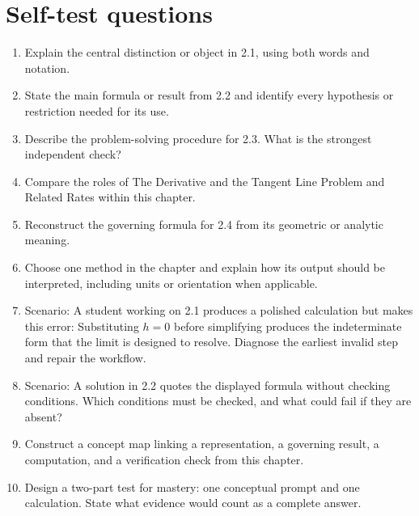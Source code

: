 \documentclass[11pt]{article}
\begin{document}
\section{Self-test questions}
\begin{enumerate}
\item Explain the central distinction or object in 2.1, using both words and notation.
\item State the main formula or result from 2.2 and identify every hypothesis or restriction needed for its use.
\item Describe the problem-solving procedure for 2.3. What is the strongest independent check?
\item Compare the roles of The Derivative and the Tangent Line Problem and Related Rates within this chapter.
\item Reconstruct the governing formula for 2.4 from its geometric or analytic meaning.
\item Choose one method in the chapter and explain how its output should be interpreted, including units or orientation when applicable.
\item Scenario: A student working on 2.1 produces a polished calculation but makes this error: Substituting $h=0$ before simplifying produces the indeterminate form that the limit is designed to resolve. Diagnose the earliest invalid step and repair the workflow.
\item Scenario: A solution in 2.2 quotes the displayed formula without checking conditions. Which conditions must be checked, and what could fail if they are absent?
\item Construct a concept map linking a representation, a governing result, a computation, and a verification check from this chapter.
\item Design a two-part test for mastery: one conceptual prompt and one calculation. State what evidence would count as a complete answer.
\end{enumerate}

\end{document}

